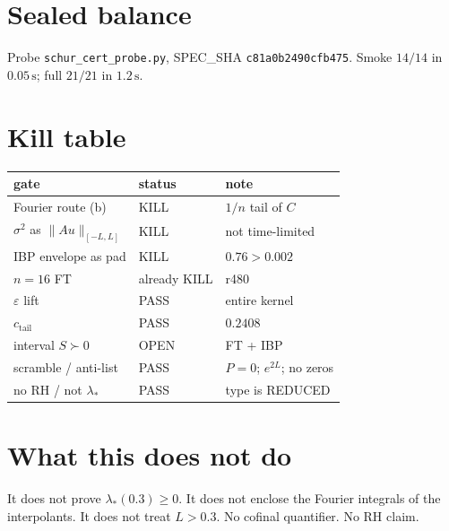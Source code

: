 \documentclass[11pt]{article}
\theoremstyle{remark}
\begin{document}
\section{Sealed balance}

Probe \texttt{schur\_cert\_probe.py},
SPEC\_SHA \texttt{c81a0b2490cfb475}.
Smoke $14/14$ in $0.05\,\mathrm{s}$; full $21/21$ in $1.2\,\mathrm{s}$.

\section{Kill table}

\begin{center}
\small
\begin{tabular}{@{}lll@{}}
\toprule
gate & status & note\\
\midrule
Fourier route (b) & KILL & $1/n$ tail of $C$\\
$\sigma^2$ as $\|Au\|_{[-L,L]}$ & KILL & not time-limited\\
IBP envelope as pad & KILL & $0.76>0.002$\\
$n=16$ FT & already KILL & r480\\
$\varepsilon$ lift & PASS & entire kernel\\
$c_{\mathrm{tail}}$ & PASS & $0.2408$\\
interval $S\succ0$ & OPEN & FT + IBP\\
scramble / anti-list & PASS & $P=0$; $e^{2L}$; no zeros\\
no RH / not $\lambda_*$ & PASS & type is REDUCED\\
\bottomrule
\end{tabular}
\end{center}

\section{What this does not do}

It does not prove $\lambda_*(0.3)\ge0$.
It does not enclose the Fourier integrals of the interpolants.
It does not treat $L>0.3$.
No cofinal quantifier.
No RH claim.
\end{document}
